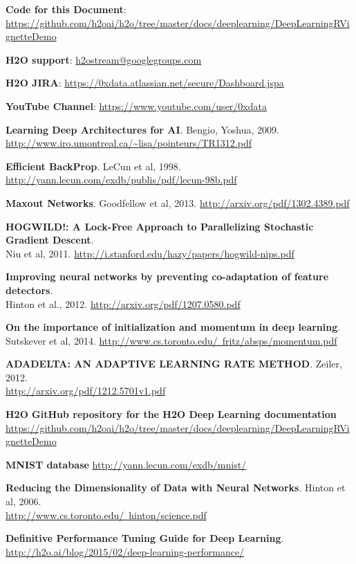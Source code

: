 \documentclass{article}[11pt]
\begin{document}
\textbf{Code for this Document}:   \\
 {\url{https://github.com/h2oai/h2o/tree/master/docs/deeplearning/DeepLearningRVignetteDemo}}

\textbf{H2O support}:   {\url{h2ostream@googlegroups.com}}

\textbf{H2O JIRA}: {\url{https://0xdata.atlassian.net/secure/Dashboard.jspa}}

\textbf{YouTube Channel}: {\url{https://www.youtube.com/user/0xdata}}

\textbf{Learning Deep Architectures for AI}. Bengio, Yoshua, 2009. \\
 {\url{http://www.iro.umontreal.ca/~lisa/pointeurs/TR1312.pdf}}

\textbf{Efficient BackProp}.  {LeCun et al, 1998}. {\url{http://yann.lecun.com/exdb/publis/pdf/lecun-98b.pdf}}

\textbf{Maxout Networks}. {Goodfellow et al, 2013}.  {\url{http://arxiv.org/pdf/1302.4389.pdf}}

\textbf{HOGWILD!: A Lock-Free Approach to Parallelizing Stochastic Gradient Descent}.  \\
{Niu et al, 2011}.  {\url{http://i.stanford.edu/hazy/papers/hogwild-nips.pdf}}

\textbf{Improving neural networks by preventing co-adaptation of feature detectors}.  \\
{Hinton et al., 2012}.  \href{http://arxiv.org/pdf/1207.0580.pdf}{http://arxiv.org/pdf/1207.0580.pdf}

\textbf{On the importance of initialization and momentum in deep learning}.  {Sutskever et al, 2014}.  \href{http://www.cs.toronto.edu/~fritz/absps/momentum.pdf}{http://www.cs.toronto.edu/~fritz/absps/momentum.pdf}

\textbf{ADADELTA: AN ADAPTIVE LEARNING RATE METHOD}. {Zeiler, 2012}.  \\
 \href{http://arxiv.org/pdf/1212.5701v1.pdf}{http://arxiv.org/pdf/1212.5701v1.pdf}

\textbf{H2O GitHub repository for the H2O Deep Learning documentation} \\
 \href{https://github.com/h2oai/h2o/tree/master/docs/deeplearning/DeepLearningRVignetteDemo}{https://github.com/h2oai/h2o/tree/master/docs/deeplearning/DeepLearningRVignetteDemo}

\textbf{{MNIST database}}  \href{http://yann.lecun.com/exdb/mnist/}{http://yann.lecun.com/exdb/mnist/}

\textbf{Reducing the Dimensionality of
Data with Neural Networks}.  {Hinton et al, 2006}. \\
 \href{http://www.cs.toronto.edu/~hinton/science.pdf}{http://www.cs.toronto.edu/~hinton/science.pdf}

\textbf{Definitive Performance Tuning Guide for Deep Learning}. \href{http://h2o.ai/blog/2015/02/deep-learning-performance/}{http://h2o.ai/blog/2015/02/deep-learning-performance/}
\end{document}
